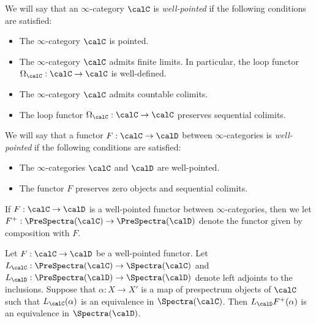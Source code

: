 \begin{definition}\label{wellp}
We will say that an $\infty$-category $\calC$ is {\it well-pointed}
if the following conditions are satisfied:
\begin{itemize}
\item[$(1)$] The $\infty$-category $\calC$ is pointed.
\item[$(2)$] The $\infty$-category $\calC$ admits finite limits. In particular,
the loop functor $\Omega_{\calC}: \calC \rightarrow \calC$ is well-defined.
\item[$(3)$] The $\infty$-category $\calC$ admits countable colimits.
\item[$(4)$] The loop functor $\Omega_{\calC}: \calC \rightarrow \calC$ preserves
sequential colimits.
\end{itemize}
\end{definition}

\begin{definition}
We will say that a functor $F: \calC \rightarrow \calD$ between $\infty$-categories
is {\it well-pointed} if the following conditions are satisfied:
\begin{itemize}
\item[$(1)$] The $\infty$-categories $\calC$ and $\calD$ are well-pointed.
\item[$(2)$] The functor $F$ preserves zero objects and sequential colimits.
\end{itemize}
\end{definition}

\begin{notation}
If $F: \calC \rightarrow \calD$ is a well-pointed functor between $\infty$-categories,
then we let $F^{+}: \PreSpectra(\calC) \rightarrow \PreSpectra(\calD)$ denote the functor
given by composition with $F$.
\end{notation}

\begin{proposition}\label{coomer}
Let $F: \calC \rightarrow \calD$ be a well-pointed functor. Let $L_{\calC}: \PreSpectra(\calC) \rightarrow \Spectra(\calC)$ and $L_{\calD}: \PreSpectra(\calD) \rightarrow \Spectra(\calD)$ denote left adjoints to the inclusions.
Suppose that $\alpha: X \rightarrow X'$ is a map of prespectrum objects of $\calC$ such that
$L_{\calC}( \alpha)$ is an equivalence in $\Spectra(\calC)$. Then $L_{\calD} F^{+}(\alpha)$ is an equivalence in $\Spectra(\calD)$.
\end{proposition}

